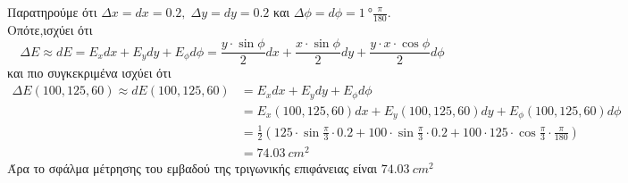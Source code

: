 \begin{solution}
\item {}

  Παρατηρούμε ότι $ \Delta x = dx = 0.2, \; \Delta y = dy = 0.2 $ και 
  $ \Delta \phi = d\phi = \SI{1}{\degree} \frac{\pi}{180} $. Οπότε,ισχύει ότι
  \begin{equation*}
    \Delta E \approx dE = E_{x} dx + E_{y} dy + E_{\phi} d\phi = \frac{y \cdot
    \sin{\phi}}{2} dx + \frac{x \cdot \sin{\phi}}{2} dy + 
    \frac{y \cdot x \cdot \cos{\phi}}{2} d\phi
  \end{equation*} 
  και πιο συγκεκριμένα ισχύει ότι 
  \begin{align*}
    \Delta E(100,125,60) \approx dE(100,125,60) 
  &= E_{x} dx + E_{y} dy + E_{\phi} d\phi \\
  &= E_{x}(100,125,60) dx + E_{y}(100,125,60) dy + E_{\phi}(100,125,60) d\phi \\
  &= \frac{1}{2} \left(125 \cdot \sin{\frac{\pi}{3}} \cdot 0.2 + 100 \cdot
    \sin{\frac{\pi}{3}} \cdot 0.2 + 100 \cdot 125 \cdot \cos{\frac{\pi}{3}} \cdot
  \frac{\pi}{180}\right) \\
  &= \SI{74.03}{cm^{2}}
  \end{align*}
  Άρα το σφάλμα μέτρησης του εμβαδού της τριγωνικής επιφάνειας είναι 
  $ \SI{74.03}{cm^{2}} $
\end{solution}

